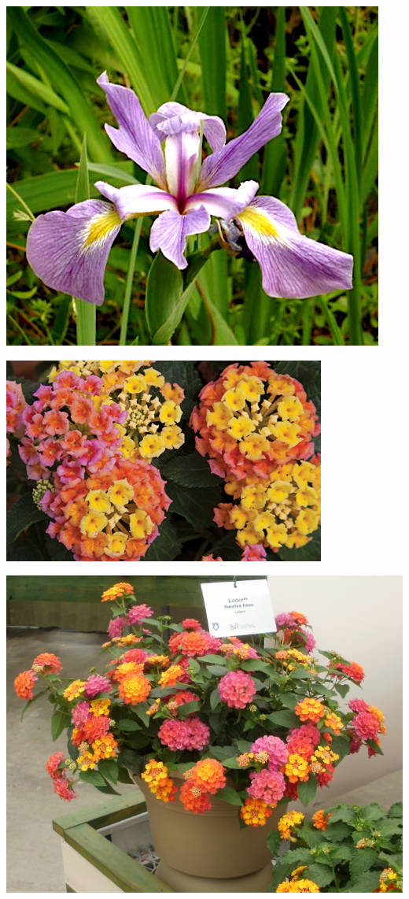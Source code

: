 \documentclass{article}
\begin{document}
\begin{center}
\includegraphics[height=0.925\paperheight]{../Iris_RiverIris.jpg}
\end{center}
\newpage

\begin{center}
\includegraphics[height=0.925\paperheight]{../Lantana.jpg}
\end{center}
\newpage

\begin{center}
\includegraphics[height=0.925\paperheight]{../Lantana2.jpg}
\end{center}
\newpage
\end{document}
